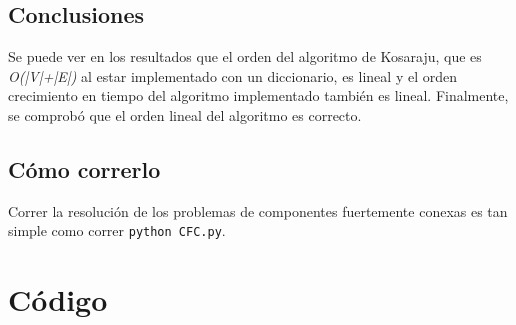 \documentclass[a4paper,10pt]{article}
\begin{document}
\subsection{Conclusiones}
    Se puede ver en los resultados que el orden del algoritmo de Kosaraju, que es \emph{O(|V|+|E|)} al estar implementado con un diccionario, es lineal y el orden crecimiento en tiempo del algoritmo implementado también es lineal. Finalmente, se comprobó que el orden lineal del algoritmo es correcto.
\subsection{Cómo correrlo}
	Correr la resolución de los problemas de componentes fuertemente conexas es tan simple como correr \texttt{python CFC.py}.

\pagebreak

\newpage
\section{Código}
\lstset{
	language=Python, columns=flexible, breaklines=true, frame=single, title=asignacion\_de\_residencias.py
}


\lstset{ title=CFC.py }


\lstset{ title=correr\_asignacion.py }


\lstset{ title=dfs.py }


\lstset{ title=dfs\_iterativo.py }


\lstset{ title=grafo.py }


\lstset{ title=parser.py }


\lstset{ title=puntos\_articulacion.py }


\lstset{ title=resultado\_DFS.py }


\lstset{ title=tiempo.py }

\end{document}

